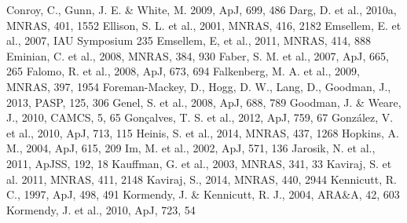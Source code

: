 \documentclass[useAMS,usenatbib]{mn2e}
\begin{document}
\begin{thebibliography}{}
 Conroy, C., Gunn, J. E. \& White, M. 2009, ApJ, 699, 486
 Darg, D. et al., 2010a, MNRAS, 401, 1552
 Ellison, S. L. et al., 2001, MNRAS, 416, 2182
 Emsellem, E. et al., 2007, IAU Symposium 235
 Emsellem, E, et al., 2011, MNRAS, 414, 888
 Eminian, C. et al., 2008, MNRAS, 384, 930
 Faber, S. M. et al., 2007, ApJ, 665, 265
 Falomo, R. et al., 2008, ApJ, 673, 694
 Falkenberg, M. A. et al., 2009, MNRAS, 397, 1954
 Foreman-Mackey, D., Hogg, D. W., Lang, D., Goodman, J., 2013, PASP, 125, 306
 Genel, S. et al., 2008, ApJ, 688, 789
 Goodman, J. \& Weare, J., 2010, CAMCS, 5, 65
 Gon\c calves, T. S. et al., 2012, ApJ, 759, 67
 Gonz\'alez, V. et al., 2010, ApJ, 713, 115
 Heinis, S. et al., 2014, MNRAS, 437, 1268
 Hopkins, A. M., 2004, ApJ, 615, 209
 Im, M. et al., 2002, ApJ, 571, 136
 Jarosik, N. et al., 2011, ApJSS, 192, 18
 Kauffman, G. et al., 2003, MNRAS, 341, 33
 Kaviraj, S. et al. 2011, MNRAS, 411, 2148
 Kaviraj, S., 2014, MNRAS, 440, 2944
 Kennicutt, R. C., 1997, ApJ, 498, 491
 Kormendy, J. \& Kennicutt, R. J., 2004, ARA\&A, 42, 603
 Kormendy, J. et al., 2010, ApJ, 723, 54

\end{thebibliography}
\end{document}
